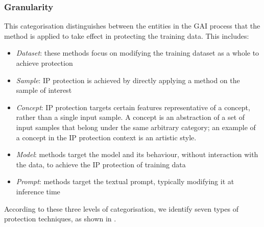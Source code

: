 \documentclass[conference,table]{IEEEtran} %
\begin{document}
\subsubsection{Granularity}
This categorisation distinguishes between the entities in the GAI process that the method is applied to take effect in protecting the training data. 
This includes:
\begin{itemize}
    \item \textit{Dataset}: these methods focus on modifying the training dataset as a whole to achieve protection
    \item \textit{Sample}: IP protection is achieved by directly applying a method on the sample of interest
    \item \textit{Concept}: IP protection targets certain features representative of a concept, rather than a single input sample. A concept is an abstraction of a set of input samples that belong under the same arbitrary category; an example of a concept in the IP protection context is an artistic style.
    \item \textit{Model}: methods target the model and its behaviour, without interaction with the data, to achieve the IP protection of training data
    \item \textit{Prompt}: methods target the textual prompt, typically modifying it at inference time
\end{itemize}

According to these three levels of categorisation, we identify seven types of protection techniques, as shown in . 


\end{document}
